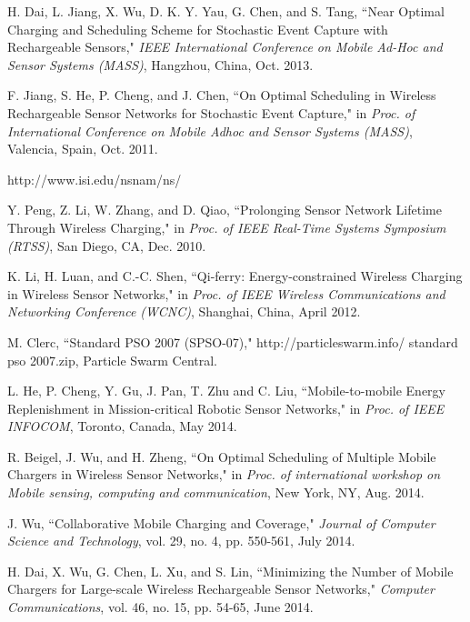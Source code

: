 \documentclass[twocolumn,10pt]{IEEEtran}
\begin{document}
\begin{thebibliography}{99}
H. Dai, L. Jiang, X. Wu, D. K. Y. Yau, G. Chen, and S. Tang, ``Near Optimal Charging and Scheduling Scheme for Stochastic Event Capture with Rechargeable Sensors," \emph{IEEE International Conference on Mobile Ad-Hoc and Sensor Systems (MASS)}, Hangzhou, China, Oct. 2013. 


F. Jiang, S. He, P. Cheng, and J. Chen, ``On Optimal Scheduling in Wireless Rechargeable Sensor Networks for Stochastic Event Capture," in \emph{Proc. of International Conference on 
Mobile Adhoc and Sensor Systems (MASS)}, Valencia, Spain, Oct. 2011. 

http://www.isi.edu/nsnam/ns/



Y. Peng,  Z. Li,  W. Zhang, and  D. Qiao,  ``Prolonging Sensor Network Lifetime Through Wireless Charging," 
in \emph{Proc. of IEEE Real-Time Systems Symposium (RTSS)},  San Diego, CA, Dec. 2010. 





K. Li, H. Luan, and C.-C. Shen, ``Qi-ferry: Energy-constrained Wireless Charging in Wireless Sensor Networks," in \emph{Proc. of IEEE Wireless Communications and Networking Conference (WCNC)},  Shanghai, China, April 2012. 


M. Clerc, ``Standard PSO 2007 (SPSO-07)," http://particleswarm.info/
standard pso 2007.zip, Particle Swarm Central.

L. He, P. Cheng, Y. Gu, J. Pan, T. Zhu and C. Liu, ``Mobile-to-mobile Energy Replenishment in Mission-critical Robotic Sensor Networks," in \emph{Proc. of IEEE 
INFOCOM}, Toronto, Canada, May 2014.

R. Beigel, J. Wu, and H. Zheng, ``On Optimal Scheduling of Multiple Mobile Chargers in Wireless Sensor Networks," in \emph{Proc. of international workshop on Mobile sensing, computing and communication}, New York, NY, Aug. 2014. 
 
J. Wu, ``Collaborative Mobile Charging and Coverage," \emph{Journal of Computer Science and Technology}, vol. 29, no. 4, pp. 550-561, July 2014. 
 

H. Dai, X. Wu, G. Chen, L. Xu, and S. Lin, ``Minimizing the Number of Mobile Chargers for Large-scale Wireless Rechargeable Sensor Networks," \emph{Computer Communications}, vol. 46, no. 15, pp. 54-65, June 2014. 
 

\end{thebibliography}
\end{document}
